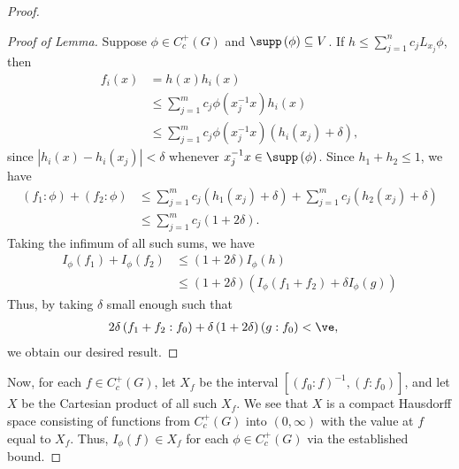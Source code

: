 \documentclass[10pt]{mypackage}
\begin{document}
\begin{proof}
\begin{proof}[Proof of Lemma]
    Suppose $\phi\in C_c^{+}\left( G \right)$ and $\supp\left( \phi \right) \subseteq V$. If $h\leq \sum_{j=1}^{n}c_jL_{x_j}\phi$, then
    \begin{align*}
      f_i(x) &= h(x)h_i(x)\\
             &\leq \sum_{j=1}^{m} c_j\phi\left( x_j^{-1}x \right)h_i(x)\\
             &\leq \sum_{j=1}^{m}c_j\phi\left( x_j^{-1}x \right)\left( h_i\left( x_j \right) + \delta \right),
    \end{align*}
    since $\left\vert h_i(x)-h_i\left( x_j \right) \right\vert < \delta$ whenever $x_j^{-1}x\in \supp\left( \phi \right)$. Since $h_1 + h_2 \leq 1$, we have
    \begin{align*}
      \left( f_1:\phi \right) + \left( f_2:\phi \right) &\leq \sum_{j=1}^{m}c_j\left( h_1\left( x_j \right) + \delta \right) + \sum_{j=1}^{m} c_j\left( h_2\left( x_j \right) + \delta \right)\\
                                                        &\leq \sum_{j=1}^{m}c_j\left( 1 + 2\delta \right).
    \end{align*}
    Taking the infimum of all such sums, we have
    \begin{align*}
      I_{\phi}\left( f_1 \right) + I_{\phi}\left( f_2 \right) &\leq \left( 1+2\delta \right)I_{\phi}\left( h \right)\\
                                                              &\leq \left( 1+2\delta \right)\left( I_{\phi}\left( f_1 + f_2 \right) + \delta I_{\phi}\left( g \right) \right)
    \end{align*}
    Thus, by taking $\delta$ small enough such that
    \begin{align*}
      2\delta \left( f_1 + f_2:f_0 \right) + \delta\left( 1+2\delta \right)\left( g:f_0 \right) &< \ve,
    \end{align*}
    we obtain our desired result.
  \end{proof}
  Now, for each $f\in C_c^{+}\left( G \right)$, let $X_f$ be the interval $\left[ \left( f_0:f \right)^{-1} , \left( f:f_0 \right) \right]$, and let $X$ be the Cartesian product of all such $X_f$. We see that $X$ is a compact Hausdorff space consisting of functions from $C_c^{+}\left( G \right)$ into $\left( 0,\infty \right)$ with the value at $f$ equal to $X_f$. Thus, $I_{\phi}\left( f \right) \in X_f$ for each $\phi\in C_c^{+}\left( G \right)$ via the established bound.\newline


\end{proof}
\end{document}
